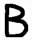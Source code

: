 \documentclass[russian,utf8,emptystyle]{eskdtext}
\begin{document}
\begin{figure}[!htb]
\includegraphics[width=\linewidth]{../data/learn/b/001}
\endminipage\hfill
{}

\end{figure}
\end{document}
